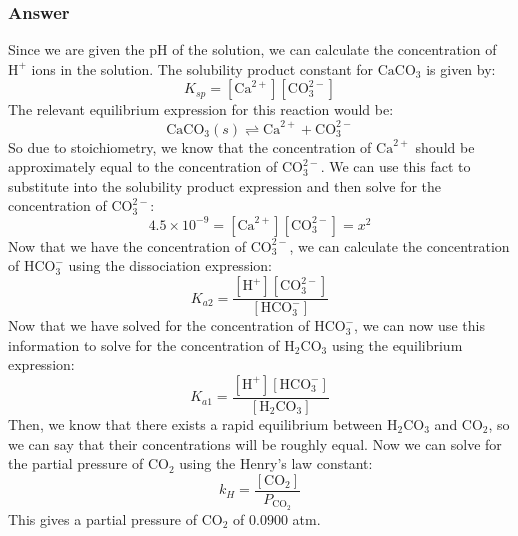 \documentclass[12pt]{article}
\begin{document}
\subsubsection{Answer}
Since we are given the $\mathrm{pH}$ of the solution, we can calculate the concentration of $\mathrm{H}^{+}$ ions in the solution. 
The solubility product constant for $\mathrm{CaCO}_{3}$ is given by:
\begin{equation}
K_{sp}=[\mathrm{Ca}^{2+}][\mathrm{CO}_{3}^{2-}]
\end{equation}
The relevant equilibrium expression for this reaction would be:
\begin{equation}
\mathrm{CaCO}_{3}(s) \rightleftharpoons \mathrm{Ca}^{2+}+\mathrm{CO}_{3}^{2-}
\end{equation}
So due to stoichiometry, we know that the concentration of $\mathrm{Ca}^{2+}$ should be approximately equal to the concentration of $\mathrm{CO}_{3}^{2-}$. We can use this fact to substitute into the solubility product expression and then solve for the concentration of $\mathrm{CO}_{3}^{2-}$:
\begin{equation}
4.5 \times 10^{-9}=[\mathrm{Ca}^{2+}][\mathrm{CO}_{3}^{2-}]=x^{2}
\end{equation}
Now that we have the concentration of $\mathrm{CO}_{3}^{2-}$, we can calculate the concentration of $\mathrm{HCO}_{3}^{-}$ using the dissociation expression:
\begin{equation}
K_{a2}=\frac{[\mathrm{H}^{+}][\mathrm{CO}_{3}^{2-}]}{[\mathrm{HCO}_{3}^{-}]}
\end{equation}
Now that we have solved for the concentration of $\mathrm{HCO}_{3}^{-}$, we can now use this information to solve for the concentration of $\mathrm{H}_{2} \mathrm{CO}_{3}$ using the equilibrium expression:
\begin{equation}
K_{a1}=\frac{[\mathrm{H}^{+}][\mathrm{HCO}_{3}^{-}]}{[\mathrm{H}_{2} \mathrm{CO}_{3}]}
\end{equation}
Then, we know that there exists a rapid equilibrium between $\mathrm{H}_{2} \mathrm{CO}_{3}$ and $\mathrm{CO}_{2}$, so we can say that their concentrations will be roughly equal. Now we can solve for the partial pressure of $\mathrm{CO}_{2}$ using the Henry's law constant:
\begin{equation}
k_{H}=\frac{[\mathrm{CO}_{2}]}{P_{\mathrm{CO}_{2}}}
\end{equation}
This gives a partial pressure of $\mathrm{CO}_{2}$ of $0.0900$ atm.
\end{document}

